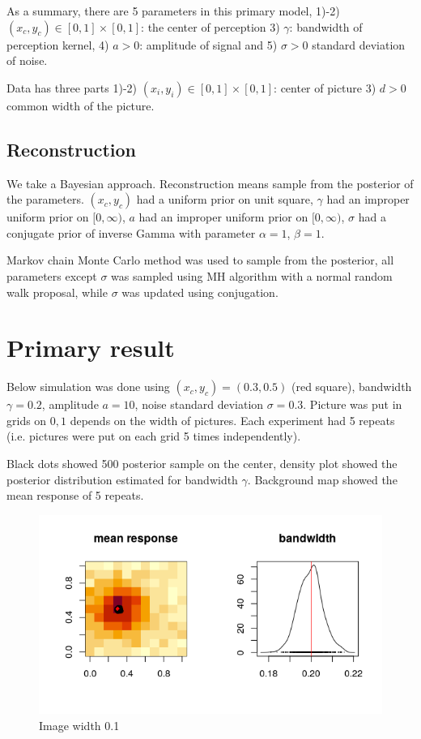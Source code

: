 \documentclass[]{article}
\begin{document}
As a summary, there are 5 parameters in this primary model, 1)-2) $(x_c, y_c)\in [0,1]\times [0,1]$: the center of perception 3) $\gamma$: bandwidth of perception kernel, 4) $a>0$: amplitude of signal and 5) $\sigma>0$ standard deviation of noise. 

Data has three parts 1)-2) $(x_i,y_i)\in [0,1]\times[0,1]$: center of picture 3) $d>0$ common width of the picture.


\subsection{Reconstruction}
We take a Bayesian approach. Reconstruction means sample from the posterior of the parameters. $(x_c,y_c)$ had a uniform prior on unit square, $\gamma$ had an improper uniform prior on $[0,\infty)$, $a$ had an improper uniform prior on $[0,\infty)$, $\sigma$ had a conjugate prior of inverse Gamma with parameter $\alpha=1$, $\beta=1$. 

Markov chain Monte Carlo method was used to sample from the posterior, all parameters except $\sigma$ was sampled using MH algorithm with a normal random walk proposal, while $\sigma$ was updated using conjugation.  


\section{Primary result}

Below simulation was done using $(x_c,y_c)=(0.3,0.5)$ (red square), bandwidth $\gamma=0.2$, amplitude $a=10$, noise standard deviation $\sigma=0.3$. Picture was put in grids on $0,1$ depends on the width of pictures. Each experiment had 5 repeats (i.e. pictures were put on each grid 5 times independently). 

Black dots showed 500 posterior sample on the center, density plot showed the posterior distribution estimated for bandwidth $\gamma$. Background map showed the mean response of 5 repeats.







\begin{figure}
	\centering
	\includegraphics[width=\linewidth]{"Single_experiment/Small_image"}
	\caption{Image width 0.1}
	\label{fig:smallimage}
\end{figure}
\end{document}
